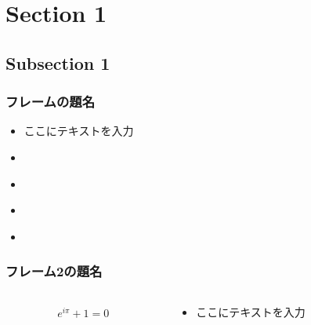 \section{Section 1}
\subsection{Subsection 1}
\begin{frame}
  \frametitle{フレームの題名}
  \begin{itemize}
    \item ここにテキストを入力
    \item \textcite{_article}
    \item \textcite{_book}
    \item \textcite{_incollection}
    \item \textcite{_inproceedings,_misc,_techreport}
  \end{itemize}

\end{frame}


\begin{frame}
  \frametitle{フレーム2の題名}
  \begin{columns}
    \begin{column}{0.5\linewidth}
      \begin{align}
        e^{i\pi} + 1 = 0
      \end{align}
    \end{column}
    \begin{column}{0.5\linewidth}
      \begin{itemize}
        \item ここにテキストを入力
      \end{itemize}
    \end{column}
  \end{columns}


\end{frame}


